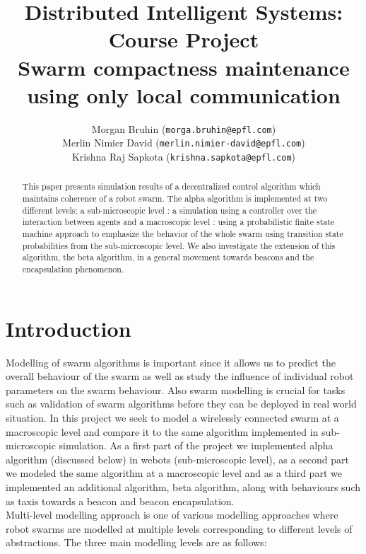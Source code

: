 \documentclass[a4paper, 10pt, conference]{ieeeconf}
\title{ %
  Distributed Intelligent Systems: Course Project\\
  Swarm compactness maintenance using only local communication
}
\author{
  Morgan Bruhin (\texttt{morga.bruhin@epfl.com}) \\
  Merlin Nimier David (\texttt{merlin.nimier-david@epfl.com}) \\
  Krishna Raj Sapkota (\texttt{krishna.sapkota@epfl.com})
}
\begin{document}
\maketitle
\thispagestyle{empty}
\pagestyle{empty}

\begin{abstract}
  This paper presents simulation results of a decentralized control algorithm which maintains coherence of a robot swarm. The alpha algorithm is implemented at two different levels; a sub-microscopic level : a simulation using a controller over the interaction between agents and a macroscopic level : using a probabilistic finite state machine approach to emphasize the behavior of the whole swarm using transition state probabilities from the sub-microscopic level. We also investigate the extension of this algorithm, the beta algorithm, in a general movement towards beacons and the encapsulation phenomenon.
\end{abstract}

\section{Introduction}
  Modelling of swarm algorithms is important since it allows us to predict the overall behaviour of the swarm as well as study the influence of individual robot parameters on the swarm behaviour. Also swarm modelling is crucial for tasks such as validation of swarm algorithms before they can be deployed in real world situation. In this project we seek to model a wirelessly connected swarm at a macroscopic level and compare it to the same algorithm implemented in sub-microscopic simulation. As a first part of the project we implemented alpha algorithm (discussed below) in webots (sub-microscopic level), as a second part we modeled the same algorithm at a macroscopic level and as a third part we implemented an additional algorithm, beta algorithm, along with behaviours such as taxis towards a beacon and beacon encapsulation.\\

  
   Multi-level modelling approach is one of various modelling approaches where robot swarms are modelled at multiple levels corresponding to different levels of abstractions. 
The three main modelling levels are as follows:
\end{document}
